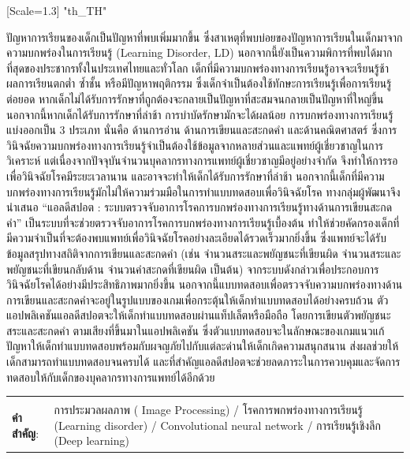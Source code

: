 \documentclass[12pt,oneside,openright,a4paper]{cpe-thai-project}
\begin{document}
{\newfontfamily{}[Scale=1.3]
\XeTeXlinebreaklocale "th_TH"	
\thaifont
\thaiabstract

ปัญหาการเรียนของเด็กเป็นปัญหาที่พบเพิ่มมากขึ้น ซึ่งสาเหตุที่พบบ่อยของปัญหาการเรียนในเด็กมาจากความบกพร่องในการเรียนรู้ (Learning Disorder, LD)
 นอกจากนี้ยังเป็นความพิการที่พบได้มากที่สุดของประชากรทั้งในประเทศไทยและทั่วโลก เด็กที่มีความบกพร่องทางการเรียนรู้อาจจะเรียนรู้ช้า ผลการเรียนตกต่ำ ซ้ำชั้น หรือมีปัญหาพฤติกรรม ซึ่งเด็กจำเป็นต้องใช้ทักษะการเรียนรู้เพื่อการเรียนรู้ต่อยอด
  หากเด็กไม่ได้รับการรักษาที่ถูกต้องจะกลายเป็นปัญหาที่สะสมจนกลายเป็นปัญหาที่ใหญ่ขึ้น นอกจากนี้หากเด็กได้รับการรักษาที่ล่าช้า การบำบัดรักษามักจะได้ผลน้อย  การบกพร่องทางการเรียนรู้แบ่งออกเป็น 3 ประเภท นั่นคือ ด้านการอ่าน ด้านการเขียนและสะกดคำ
   และด้านคณิตศาสตร์ ซึ่งการวินิจฉัยความบกพร่องทางการเรียนรู้จำเป็นต้องใช้ข้อมูลจากหลายส่วนและแพทย์ผู้เชี่ยวชาญในการวิเคราะห์ แต่เนื่องจากปัจจุบันจำนวนบุคลากรทางการแพทย์ผู้เชี่ยวชาญมีอยู่อย่างจำกัด จึงทำให้การรอเพื่อวินิจฉัยโรคมีระยะเวลานาน 
   และอาจจะทำให้เด็กได้รับการรักษาที่ล่าช้า นอกจากนี้เด็กที่มีความบกพร่องทางการเรียนรู้มักไม่ให้ความร่วมมือในการทำแบบทดสอบเพื่อวินิจฉัยโรค ทางกลุ่มผู้พัฒนาจึงนำเสนอ “แอลดีสปอต :  ระบบตรวจจับอาการโรคการบกพร่องทางการเรียนรู้ทางด้านการเขียนสะกดคำ”  
   เป็นระบบที่จะช่วยตรวจจับอาการโรคการบกพร่องทางการเรียนรู้เบื้องต้น ทำให้ช่วยคัดกรองเด็กที่มีความจำเป็นที่จะต้องพบแพทย์เพื่อวินิจฉัยโรคอย่างละเอียดได้รวดเร็วมากยิ่งขึ้น ซึ่งแพทย์จะได้รับข้อมูลสรุปทางสถิติจากการเขียนและสะกดคำ (เช่น จำนวนสระและพยัญชนะที่เขียนผิด 
   จำนวนสระและพยัญชนะที่เขียนกลับด้าน จำนวนคำสะกดที่เขียนผิด เป็นต้น) จากระบบดังกล่าวเพื่อประกอบการวินิจฉัยโรคได้อย่างมีประสิทธิภาพมากยิ่งขึ้น
    นอกจากนี้แบบทดสอบเพื่อตรวจจับความบกพร่องทางด้านการเขียนและสะกดคำจะอยู่ในรูปแบบของเกมเพื่อกระตุ้นให้เด็กทำแบบทดสอบได้อย่างครบถ้วน ตัวแอปพลิเคชันแอลดีสปอตจะให้เด็กทำแบบทดสอบผ่านแท็ปเล็ตหรือมือถือ 
    โดยการเขียนตัวพยัญชนะ สระและสะกดคำ ตามเสียงที่ขึ้นมาในแอปพลิเคชัน ซึ่งตัวแบบทดสอบจะในลักษณะของเกมแนวแก้ปัญหาให้เด็กทำแบบทดสอบพร้อมกับผจญภัยไปกับแต่ละด่านให้เด็กเกิดความสนุกสนาน ส่งผลช่วยให้เด็กสามารถทำแบบทดสอบจนครบได้
     และที่สำคัญแอลดีสปอตจะช่วยลดภาระในการควบคุมและจัดการทดสอบให้กับเด็กของบุคลากรทางการแพทย์ได้อีกด้วย


\begin{flushleft}
\begin{tabular*}{\textwidth}{@{}lp{}}
 & \\

\textbf{คำสำคัญ}: & การประมวลผลภาพ ( Image Processing) / โรคการพกพร่องทางการเรียนรู้ (Learning disorder) / Convolutional neural network / การเรียนรู้เชิงลึก (Deep learning)
\end{tabular*}
\end{flushleft}
\endabstract
}
\end{document}
